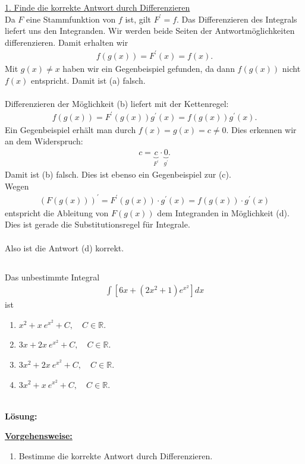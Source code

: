 \underline{1. Finde die korrekte Antwort durch Differenzieren}\\
Da $ F $ eine Stammfunktion von $ f $ ist, gilt $ F^\prime = f $.
Das Differenzieren des Integrals liefert uns den Integranden.
Wir werden beide Seiten der Antwortmöglichkeiten differenzieren.
Damit erhalten wir
\begin{align*}
f(g(x)) = F^\prime(x) = f(x).
\end{align*}
Mit $ g(x) \neq x $ haben wir ein Gegenbeispiel gefunden, da dann $ f(g(x)) $ nicht $ f(x) $ entspricht. Damit ist (a) falsch.\\
\\
Differenzieren der Möglichkeit (b) liefert mit der Kettenregel:
\begin{align*}
f(g(x)) = F^\prime(g(x)) g^\prime(x) = f(g(x)) g^\prime(x).
\end{align*}
Ein Gegenbeispiel erhält man durch $ f(x) = g(x) = c \neq 0 $.
Dies erkennen wir an dem Widerspruch:
\begin{align*}
c = \underbrace{c}_{F^\prime} \cdot \underbrace{0}_{g^\prime}.
\end{align*}
Damit ist (b) falsch.
Dies ist ebenso ein Gegenbeispiel zur (c).
\\
Wegen
\begin{align*}
\left(F(g(x))\right)^\prime = 
F^\prime (g(x)) \cdot g^\prime(x)
= 
f(g(x)) \cdot g^\prime(x)
\end{align*}
entspricht die Ableitung von $ F(g(x)) $ dem Integranden in Möglichkeit (d).
Dies ist gerade die Substitutionsregel für Integrale.\\
\\
Also ist die Antwort (d) korrekt.


\newpage

\subsection*{}
Das unbestimmte Integral
\begin{align*}
\int \left[ 6x+ (2 x^2 + 1) e^{x^2} \right] dx
\end{align*}
ist
\renewcommand{\labelenumi}{(\alph{enumi})}
\begin{enumerate}
	\item 
	$ x^2 + x \ e^{x^2} + C, \quad C \in \mathbb{R} $.
	\item 
	$ 3x  + 2x  \ e^{x^2} + C, \quad C \in \mathbb{R} $.
	\item
	$ 3x^2  + 2x  \ e^{x^2} + C, \quad C \in \mathbb{R} $.
	\item
	$ 3x^2  + x  \ e^{x^2} + C, \quad C \in \mathbb{R} $.
\end{enumerate}
\ \\
\textbf{Lösung:}
\begin{mdframed}
\underline{\textbf{Vorgehensweise:}}
\renewcommand{\labelenumi}{\theenumi.}
\begin{enumerate}
\item Bestimme die korrekte Antwort durch Differenzieren.
\end{enumerate}
\end{mdframed}

